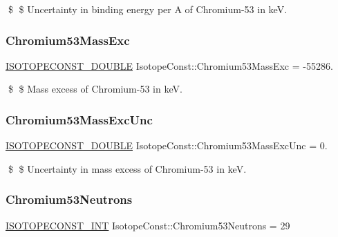 \$ \$ Uncertainty in binding energy per A of Chromium-\/53 in keV. \mbox{\label{group___isotope_const-_chromium-_cr53_ga295ec45c7b285f0c7723091ba4678bd5}} 
\subsubsection{\texorpdfstring{Chromium53\+Mass\+Exc}{Chromium53MassExc}}
{\footnotesize\ttfamily \mbox{\hyperlink{group___isotope_const-_macros_ga8f45a7272ce02c0b4c65c44636ed719a}{I\+S\+O\+T\+O\+P\+E\+C\+O\+N\+S\+T\+\_\+\+D\+O\+U\+B\+LE}} Isotope\+Const\+::\+Chromium53\+Mass\+Exc = -\/55286.}

\$ \$ Mass excess of Chromium-\/53 in keV. \mbox{\label{group___isotope_const-_chromium-_cr53_ga0754da39c3714e209d33061dd97eab37}} 
\subsubsection{\texorpdfstring{Chromium53\+Mass\+Exc\+Unc}{Chromium53MassExcUnc}}
{\footnotesize\ttfamily \mbox{\hyperlink{group___isotope_const-_macros_ga8f45a7272ce02c0b4c65c44636ed719a}{I\+S\+O\+T\+O\+P\+E\+C\+O\+N\+S\+T\+\_\+\+D\+O\+U\+B\+LE}} Isotope\+Const\+::\+Chromium53\+Mass\+Exc\+Unc = 0.}

\$ \$ Uncertainty in mass excess of Chromium-\/53 in keV. \mbox{\label{group___isotope_const-_chromium-_cr53_ga856cf165afb3962884b4f499f371e94d}} 
\subsubsection{\texorpdfstring{Chromium53\+Neutrons}{Chromium53Neutrons}}
{\footnotesize\ttfamily \mbox{\hyperlink{group___isotope_const-_macros_ga5f18360b3e99483a35c32d789e62621c}{I\+S\+O\+T\+O\+P\+E\+C\+O\+N\+S\+T\+\_\+\+I\+NT}} Isotope\+Const\+::\+Chromium53\+Neutrons = 29}

